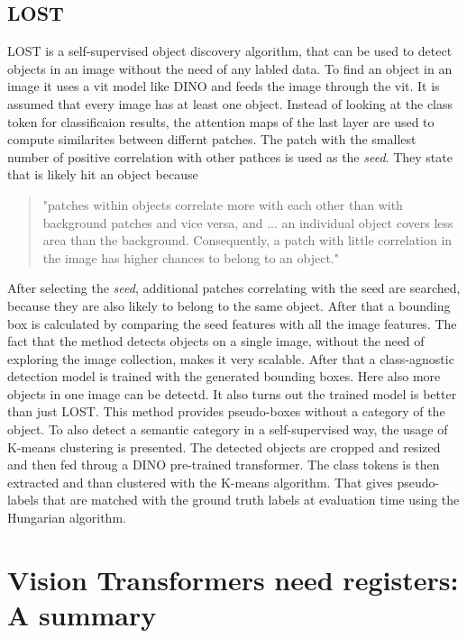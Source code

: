 \documentclass[conference]{IEEEtran}
\begin{document}
  \subsection{LOST}
  \cite{lost}
  LOST is a self-supervised object discovery algorithm, that can be used to detect objects in an image without the need of any labled data. To find an object in an image it uses a \ac{vit} model like DINO and feeds the image through the \ac{vit}. It is assumed that every image has at least one object. Instead of looking at the class token for classificaion results, the attention maps of the last layer are used to compute similarites between differnt patches. The patch with the smallest number of positive correlation with other pathces is used as the \textit{seed}. They state that is likely hit an object because
  \begin{quote}
    "patches within objects correlate more with each other than with background patches and vice versa, and ... an individual object covers less area than the background. Consequently, a patch with little correlation in the image has higher chances to belong to an object." \cite{lost}
  \end{quote}
  After selecting the \textit{seed}, additional patches correlating with the seed are searched, because they are also likely to belong to the same object. After that a bounding box is calculated by comparing the seed features with all the image features. The fact that the method detects objects on a single image, without the need of exploring the image collection, makes it very scalable. After that a class-agnostic detection model is trained with the generated bounding boxes. Here also more objects in one image can be detectd. It also turns out the trained model is better than just LOST. This method provides pseudo-boxes without a category of the object. To also detect a semantic category in a self-supervised way, the usage of K-means clustering is presented. The detected objects are cropped and resized and then fed throug a DINO pre-trained transformer. The class tokens is then extracted and than clustered with the K-means algorithm. That gives pseudo-labels that are matched with the ground truth labels at evaluation time using the Hungarian algorithm.



  \section{Vision Transformers need registers: A summary}
\end{document}
